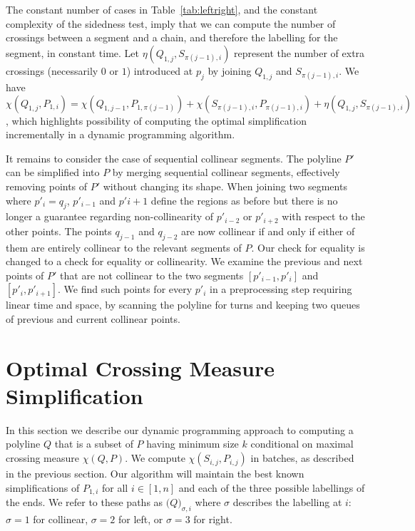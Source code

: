 \documentclass{article}
\begin{document}
The constant number of cases in Table~\ref{tab:leftright}, and the
constant complexity of the sidedness test, imply that we can compute the
number of crossings between a segment and a chain, and therefore the
labelling for the segment, in constant time.
Let $\eta(Q_{1,j},S_{\pi(j-1),i})$ represent the number of extra crossings
(necessarily $0$ or $1$) introduced at $p_j$ by joining $Q_{1,j}$ and
$S_{\pi(j-1),i}$.  We have $\chi(Q_{1,j},P_{1,i}) =
\chi(Q_{1,j-1},P_{1,\pi(j-1)}) + \chi(S_{\pi(j-1),i},P_{\pi(j-1),i}) +
\eta(Q_{1,j},S_{\pi(j-1),i})$, which highlights possibility of computing
the optimal simplification incrementally in a dynamic programming
algorithm.

It remains to consider the case of sequential collinear segments.  The
polyline $P'$ can be simplified into $P$ by merging sequential collinear
segments, effectively removing points of $P'$ without changing its shape. 
When joining two segments where $p'_i=q_j$, $p'_{i-1}$ and $p'{i+1}$ define
the regions as before but there is no longer a guarantee regarding
non-collinearity of $p'_{i-2}$ or $p'_{i+2}$ with respect to the other
points.  The points $q_{j-1}$ and $q_{j-2}$ are now collinear if and only if
either of them are entirely collinear to the relevant segments of $P$.  Our
check for equality is changed to a check for equality or collinearity.  We
examine the previous and next points of $P'$ that are not collinear to the
two segments $[p'_{i-1},p'_i]$ and $[p'_{i},p'_{i+1}]$.  We find such points
for every $p'_i$ in a preprocessing step requiring linear time and space, by
scanning the polyline for turns and keeping two queues of previous and
current collinear points.

\section{Optimal Crossing Measure Simplification}
\label{sect:method}

In this section we describe our dynamic programming approach to computing a
polyline $Q$ that is a subset of $P$ having minimum size $k$ conditional on
maximal crossing measure $\chi(Q,P)$.  We compute $\chi(S_{i,j},P_{i,j})$ in
batches, as described in the previous section.  Our algorithm will maintain
the best known simplifications of $P_{1,i}$ for all $i\in[1,n]$ and each of
the three possible labellings of the ends.  We refer to these paths as
$\mathcal(Q)_{\sigma,i}$ where $\sigma$ describes the labelling at $i$:
$\sigma=1$ for collinear, $\sigma=2$ for left, or $\sigma=3$ for right.
\end{document}
